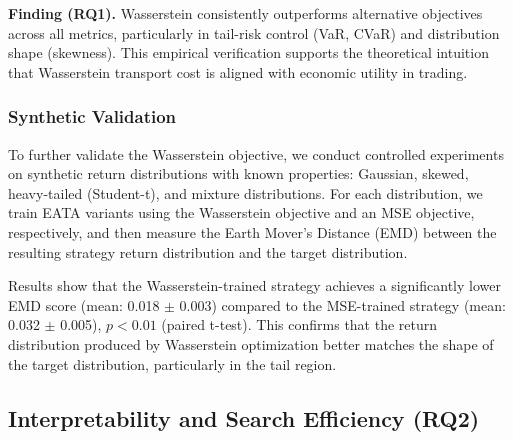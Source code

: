 \begin{table}[htbp]
\centering
\caption{Performance Comparison Across Distributional Objectives }
\label{tab:objectives}
\end{table}

\textbf{Finding (RQ1).} Wasserstein consistently outperforms alternative objectives across all metrics, particularly in tail-risk control (VaR, CVaR) and distribution shape (skewness). This empirical verification supports the theoretical intuition that Wasserstein transport cost is aligned with economic utility in trading.

\subsubsection{Synthetic Validation}

To further validate the Wasserstein objective, we conduct controlled experiments on synthetic return distributions with known properties: Gaussian, skewed, heavy-tailed (Student-t), and mixture distributions. For each distribution, we train EATA variants using the Wasserstein objective and an MSE objective, respectively, and then measure the Earth Mover's Distance (EMD) between the resulting strategy return distribution and the target distribution.

Results show that the Wasserstein-trained strategy achieves a significantly lower EMD score (mean: 0.018 $\pm$ 0.003) compared to the MSE-trained strategy (mean: 0.032 $\pm$ 0.005), $p < 0.01$ (paired t-test). This confirms that the return distribution produced by Wasserstein optimization better matches the shape of the target distribution, particularly in the tail region.

\subsection{Interpretability and Search Efficiency (RQ2)}

